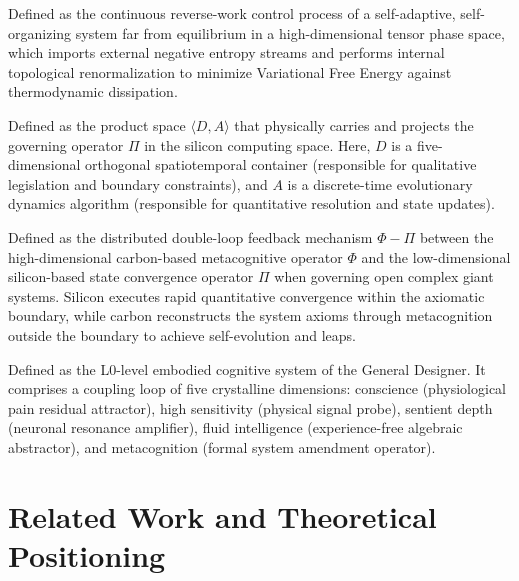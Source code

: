 \documentclass{article}
\begin{document}
\begin{definition}
Defined as the continuous reverse-work control process of a self-adaptive, self-organizing system far from equilibrium in a high-dimensional tensor phase space, which imports external negative entropy streams and performs internal topological renormalization to minimize Variational Free Energy against thermodynamic dissipation.
\end{definition}

\begin{definition}
Defined as the product space $\langle D, A \rangle$ that physically carries and projects the governing operator $\Pi$ in the silicon computing space. Here, $D$ is a five-dimensional orthogonal spatiotemporal container (responsible for qualitative legislation and boundary constraints), and $A$ is a discrete-time evolutionary dynamics algorithm (responsible for quantitative resolution and state updates).
\end{definition}

\begin{definition}
Defined as the distributed double-loop feedback mechanism $\Phi - \Pi$ between the high-dimensional carbon-based metacognitive operator $\Phi$ and the low-dimensional silicon-based state convergence operator $\Pi$ when governing open complex giant systems. Silicon executes rapid quantitative convergence within the axiomatic boundary, while carbon reconstructs the system axioms through metacognition outside the boundary to achieve self-evolution and leaps.
\end{definition}

\begin{definition}
Defined as the L0-level embodied cognitive system of the General Designer. It comprises a coupling loop of five crystalline dimensions: conscience (physiological pain residual attractor), high sensitivity (physical signal probe), sentient depth (neuronal resonance amplifier), fluid intelligence (experience-free algebraic abstractor), and metacognition (formal system amendment operator).
\end{definition}

\section{Related Work and Theoretical Positioning}
\label{related-work}
\end{document}
